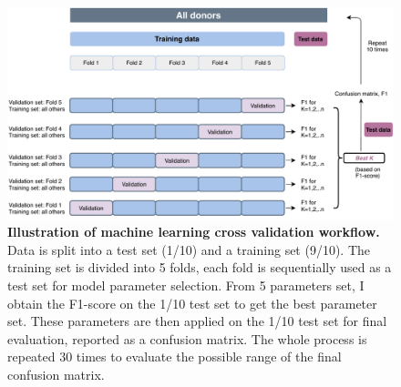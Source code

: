 \begin{figure}[h!]
    \centering
    \includegraphics[scale=0.8]{graphics/ML_demo.pdf}
    \caption{\textbf{Illustration of machine learning cross validation workflow.} Data is split into a test set (1/10) and a training set (9/10). The training set is divided into 5 folds, each fold is sequentially used as a test set for model parameter selection. From 5 parameters set, I obtain the F1-score on the 1/10 test set to get the best parameter set. These parameters are then applied on the 1/10 test set for final evaluation, reported as a confusion matrix. The whole process is repeated 30 times to evaluate the possible range of the final confusion matrix.}
    \label{fig:ML_demo}
\end{figure}
